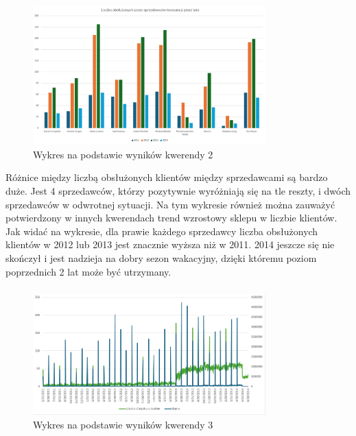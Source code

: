 \documentclass[a4paper,12pt]{article}
\begin{document}
\subsubsection{}

\begin{figure}[H]
    \centering
    \includegraphics[width=0.8\textwidth]{images/excel/02.png}
    \caption{Wykres na podstawie wyników kwerendy 2}
\end{figure}

Różnice między liczbą obsłużonych klientów między sprzedawcami są bardzo duże. Jest 4 sprzedawców, którzy pozytywnie wyróżniają się na tle reszty, i dwóch sprzedawców w odwrotnej sytuacji. Na tym wykresie również można zauważyć potwierdzony w innych kwerendach trend wzrostowy sklepu w liczbie klientów. Jak widać na wykresie, dla prawie każdego sprzedawcy liczba obsłużonych klientów w 2012 lub 2013 jest znacznie wyższa niż w 2011. 2014 jeszcze się nie skończył i jest nadzieja na dobry sezon wakacyjny, dzięki któremu poziom poprzednich 2 lat może być utrzymany.

\subsubsection{}

\begin{figure}[H]
    \centering
    \includegraphics[width=0.8\textwidth]{images/excel/03.png}
    \caption{Wykres na podstawie wyników kwerendy 3}
\end{figure}
\end{document}
